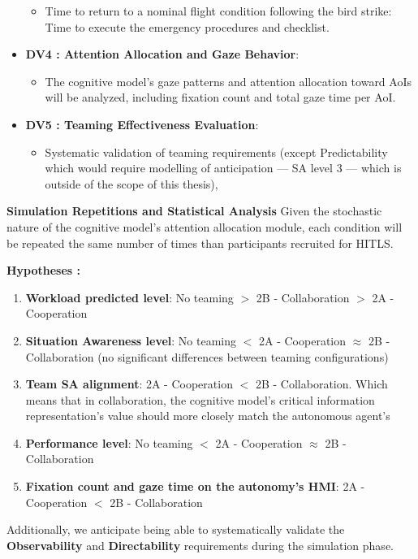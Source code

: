 \documentclass[12pt,a4paper]{article} %
\begin{document}
\begin{itemize}
		\begin{itemize}
			\item Time to return to a nominal flight condition following the bird strike: Time to execute the emergency procedures and checklist.
		\end{itemize}
		\item \textbf{DV4 : Attention Allocation and Gaze Behavior}:
		\begin{itemize}
			\item The cognitive model's gaze patterns and attention allocation toward AoIs will be analyzed, including fixation count and total gaze time per AoI.
		\end{itemize}
		\item \textbf{DV5 : Teaming Effectiveness Evaluation}:
		\begin{itemize}
			\item Systematic validation of teaming requirements (except Predictability which would require modelling of anticipation --- SA level 3 --- which is outside of the scope of this thesis), 
		\end{itemize}
	\end{itemize}
	
	\textbf{Simulation Repetitions and Statistical Analysis}
	Given the stochastic nature of the cognitive model's attention allocation module, each condition will be repeated the same number of times than participants recruited for HITLS.

	\textbf{Hypotheses :}
	\begin{enumerate}[label=\textbf{H\arabic* :}]
	\label{hypotheses}
	\item \textbf{Workload predicted level}: No teaming $>$ 2B - Collaboration $>$ 2A - Cooperation
	\item \textbf{Situation Awareness level}: No teaming $<$ 2A - Cooperation $\approx$ 2B - Collaboration (no significant differences between teaming configurations)
	\item \textbf{Team SA alignment}: 2A - Cooperation $<$ 2B - Collaboration. Which means that in collaboration, the cognitive model's critical information representation's value should more closely match the autonomous agent's
	\item \textbf{Performance level}: No teaming $<$ 2A - Cooperation $\approx$ 2B - Collaboration
	\item \textbf{Fixation count and gaze time on the autonomy's HMI}: 2A - Cooperation $<$ 2B - Collaboration
	\end{enumerate}
	Additionally, we anticipate being able to systematically validate the \textbf{Observability} and \textbf{Directability} requirements during the simulation phase.
	
\end{document}
